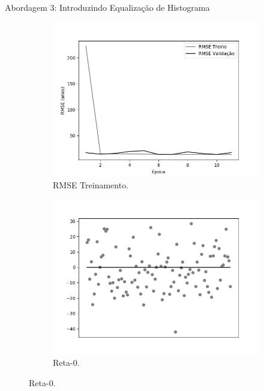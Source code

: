\begin{frame}{Abordagem 3: Introduzindo Equalização de Histograma}
  \begin{figure}[ht!]
    \caption{Resultados do treinamento e teste da CNN AlexNet \emph{ReLU}.}\label{fig:alexnet-abordagem1}
    \begin{subfigure}[hb]{0.4\linewidth}
      \caption{RMSE Treinamento.}

      \includegraphics[width=\linewidth]{img/graficos/history/alexnet/fig-history-image-treat-3-alexnet-relu-rmse.png}
    \end{subfigure}
    \begin{subfigure}[hb]{0.4\linewidth}
      \caption{Reta-0.}
      \label{fig:reta0reludying}
      \includegraphics[width=\linewidth]{img/graficos/reta0/alexnet/fig-reta-0-image-treat-3-alexnet-relu.png}%
    \end{subfigure}
\end{figure}
\end{frame}

